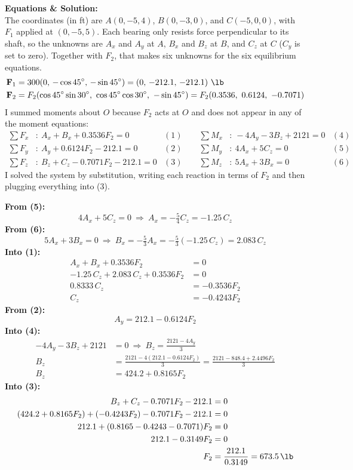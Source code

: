 \documentclass[11pt]{article}
\begin{document}
\textbf{Equations \& Solution:}\\
The coordinates (in ft) are $A(0,-5,4)$, $B(0,-3,0)$, and $C(-5,0,0)$, with $F_1$ applied at $(0,-5,5)$. Each bearing only resists force perpendicular to its shaft, so the unknowns are $A_x$ and $A_y$ at $A$, $B_x$ and $B_z$ at $B$, and $C_z$ at $C$ ($C_y$ is set to zero). Together with $F_2$, that makes six unknowns for the six equilibrium equations.
\begin{align*}
\mathbf F_1 &= 300(0,\,-\cos45^\circ,\,-\sin45^\circ)=(0,\,-212.1,\,-212.1)\ \si{\lb}\\
\mathbf F_2 &= F_2(\cos45^\circ\sin30^\circ,\ \cos45^\circ\cos30^\circ,\ -\sin45^\circ)=F_2(0.3536,\ 0.6124,\ -0.7071)
\end{align*}
I summed moments about $O$ because $F_2$ acts at $O$ and does not appear in any of the moment equations:
\begin{align*}
\textstyle\sum F_x&:\ A_x+B_x+0.3536F_2=0 &(1) \qquad \textstyle\sum M_x&:\ -4A_y-3B_z+2121=0 &(4)\\
\textstyle\sum F_y&:\ A_y+0.6124F_2-212.1=0 &(2) \qquad \textstyle\sum M_y&:\ 4A_x+5C_z=0 &(5)\\
\textstyle\sum F_z&:\ B_z+C_z-0.7071F_2-212.1=0 &(3) \qquad \textstyle\sum M_z&:\ 5A_x+3B_x=0 &(6)
\end{align*}
I solved the system by substitution, writing each reaction in terms of $F_2$ and then plugging everything into (3).

\textbf{From (5):}
\[4A_x+5C_z=0\ \Rightarrow\ A_x=-\tfrac54C_z=-1.25\,C_z\]
\textbf{From (6):}
\[5A_x+3B_x=0\ \Rightarrow\ B_x=-\tfrac53A_x=-\tfrac53(-1.25\,C_z)=2.083\,C_z\]
\textbf{Into (1):}
\begin{align*}
A_x+B_x+0.3536F_2&=0\\
-1.25\,C_z+2.083\,C_z+0.3536F_2&=0\\
0.8333\,C_z&=-0.3536F_2\\
C_z&=-0.4243F_2
\end{align*}
\textbf{From (2):}
\[A_y=212.1-0.6124F_2\]
\textbf{Into (4):}
\begin{align*}
-4A_y-3B_z+2121&=0\ \Rightarrow\ B_z=\frac{2121-4A_y}{3}\\
B_z&=\frac{2121-4(212.1-0.6124F_2)}{3}=\frac{2121-848.4+2.4496F_2}{3}\\
B_z&=424.2+0.8165F_2
\end{align*}
\textbf{Into (3):}
\begin{align*}
B_z+C_z-0.7071F_2-212.1&=0\\
(424.2+0.8165F_2)+(-0.4243F_2)-0.7071F_2-212.1&=0\\
212.1+(0.8165-0.4243-0.7071)F_2&=0\\
212.1-0.3149F_2&=0\\
F_2&=\frac{212.1}{0.3149}=\SI{673.5}{\lb}
\end{align*}
\end{document}

